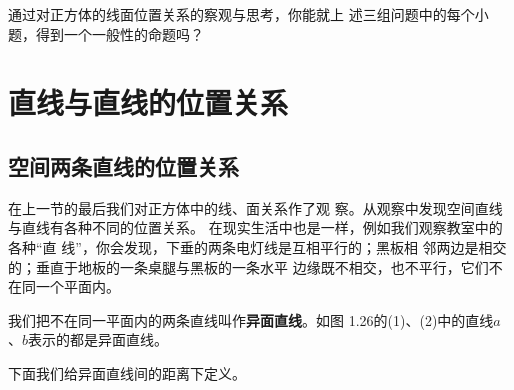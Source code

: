 通过对正方体的线面位置关系的察观与思考，你能就上
述三组问题中的每个小题，得到一个一般性的命题吗？

\section{直线与直线的位置关系}
\subsection{空间两条直线的位置关系}
在上一节的最后我们对正方体中的线、面关系作了观
察。从观察中发现空间直线与直线有各种不同的位置关系。
在现实生活中也是一样，例如我们观察教室中的各种“直
线”，你会发现，下垂的两条电灯线是互相平行的；黑板相
邻两边是相交的；垂直于地板的一条桌腿与黑板的一条水平
边缘既不相交，也不平行，它们不在同一个平面内。

我们把不在同一平面内的两条直线叫作\textbf{异面直线}。如图
1.26的(1)、(2)中的直线$a$、$b$表示的都是异面直线。



















\begin{example}
  
\end{example}

\begin{solution}
  
\end{solution}
\begin{example}
  
\end{example}

\begin{solution}
  
\end{solution}

\begin{example}
  
\end{example}
\begin{example}
  
\end{example}



下面我们给异面直线间的距离下定义。

